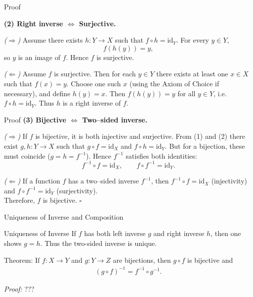 \begin{frame}{Proof }

\textbf{(2) Right inverse $\Leftrightarrow$ Surjective.}

\emph{($\Rightarrow$)}
Assume there exists \(h:Y\to X\) such that \(f\circ h=\mathrm{id}_Y.\)
For every \(y\in Y\),
\[
f(h(y)) = y,
\]
so \(y\) is an image of \(f\). Hence \(f\) is surjective.

\emph{($\Leftarrow$)}
Assume \(f\) is surjective.
Then for each \(y\in Y\) there exists at least one \(x\in X\) such that \(f(x)=y\).
Choose one such \(x\) (using the Axiom of Choice if necessary), and define \(h(y)=x.\)
Then \(f(h(y))=y\) for all \(y\in Y\), i.e. \(f\circ h=\mathrm{id}_Y.\)
Thus \(h\) is a right inverse of \(f.\)
\end{frame}

\begin{frame}{Proof }
\textbf{(3) Bijective $\Leftrightarrow$ Two–sided inverse.}

\emph{($\Rightarrow$)}
If \(f\) is bijective, it is both injective and surjective.
From (1) and (2) there exist \(g,h:Y\to X\) such that \(g\circ f=\mathrm{id}_X\) and \(f\circ h=\mathrm{id}_Y.\)
But for a bijection, these must coincide (\(g=h=f^{-1}\)).
Hence \(f^{-1}\) satisfies both identities:
\[
f^{-1}\circ f = \mathrm{id}_X,\qquad f\circ f^{-1} = \mathrm{id}_Y.
\]

\emph{($\Leftarrow$)}
If a function \(f\) has a two–sided inverse \(f^{-1}\), then \(f^{-1}\circ f=\mathrm{id}_X\) (injectivity) and \(f\circ f^{-1}=\mathrm{id}_Y\) (surjectivity).\\

Therefore, \(f\) is bijective. \(\square\)
\end{frame}


\begin{frame}{Uniqueness of Inverse and Composition}
\begin{block}{Uniqueness of Inverse}
    If \(f\) has both left inverse \(g\) and right inverse \(h\), then one shows \(g = h\).
Thus the two-sided inverse is unique.
\end{block}

\smallskip
\begin{block}{Theorem:} If \(f: X \to Y\) and \(g: Y \to Z\) are bijections, then \(g \circ f\) is bijective and
\begin{align*}
(g \circ f)^{-1} = f^{-1} \circ g^{-1}.
\end{align*}

\emph{Proof:} ???

\end{block}
\end{frame}

